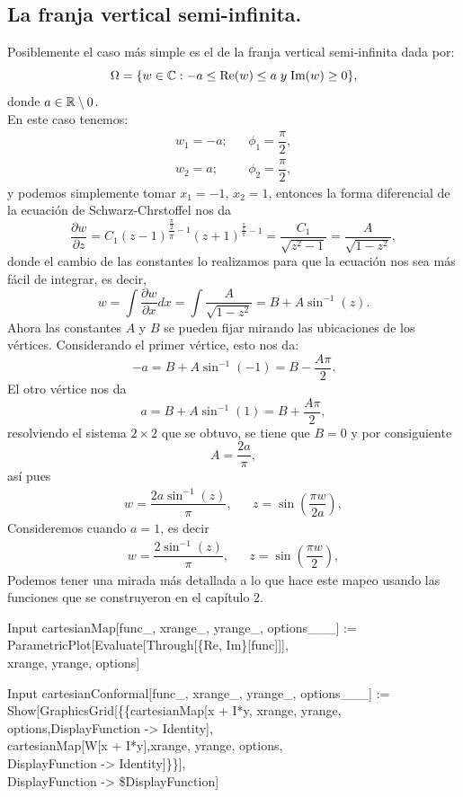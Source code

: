 \subsection{La franja vertical semi-infinita.}
Posiblemente el caso más simple es el de la franja vertical semi-infinita dada por:
$$\Omega=\{ w\in \mathbb{C} : -a\leq \mbox{Re}(w)\leq a\; y \; \mbox{Im}(w)\geq 0  \},$$
donde $a\in\mathbb{R}\setminus{0}$.\\
En este caso tenemos:
\[
\begin{array}{lcr}
	w_1=-a;&&\phi_1=\dfrac{\pi}{2},\\
	w_2=a;&&\phi_2=\dfrac{\pi}{2},
\end{array}
\]
y podemos simplemente tomar $x_1=-1$, $x_2=1$, entonces la forma diferencial de la ecuación de Schwarz-Chrstoffel nos da
$$\dfrac{\partial w}{\partial z}=C_1(z-1)^{\dfrac{\frac{\pi}{2}}{\pi}-1}(z+1)^{\frac{\frac{\pi}{2}}{\pi}-1}=\dfrac{C_1}{\sqrt{z^2-1}}=\dfrac{A}{\sqrt{1-z^2}},$$
donde el cambio de las constantes lo realizamos para que la ecuación nos sea más fácil de integrar, es decir,
\[
w=\int \dfrac{\partial w}{\partial x}dx=\int \dfrac{A}{\sqrt{1-z^2}}=B+A\sin^{-1}(z).
\]
Ahora las constantes $A$ y $B$ se pueden fijar mirando las ubicaciones de los vértices. Considerando el primer vértice, esto nos da:
$$-a=B+A\sin^{-1}(-1)=B-\dfrac{A\pi}{2}.$$
El otro vértice nos da
$$a=B+A\sin^{-1}(1)=B+\dfrac{A\pi}{2},$$
resolviendo el sistema $2\times2$ que se obtuvo, se tiene que $B=0$ y por consiguiente $$A=\dfrac{2a}{\pi},$$
así pues 
\[
\begin{array}{lcr}
	w=\dfrac{2a\sin^{-1}(z)}{\pi},&&z=\sin\left(\dfrac{\pi w}{2a}\right),
\end{array}
\]
Consideremos cuando $a=1$, es decir
\[
\begin{array}{lcr}
	w=\dfrac{2\sin^{-1}(z)}{\pi},&&z=\sin\left(\dfrac{\pi w}{2}\right),
\end{array}
\]
Podemos tener una mirada más detallada a lo que hace este mapeo usando las funciones que se construyeron en el capítulo 2.

\begin{mmaCell}{Input}
	 cartesianMap[func_, xrange_, yrange_, options___] := \\ParametricPlot[Evaluate[Through[\{Re, Im\}[func]]],\\xrange, yrange, options]
\end{mmaCell}

\newpage
\begin{mmaCell}{Input}
	 cartesianConformal[func_, xrange_, yrange_, options___] :=\\Show[GraphicsGrid[\{\{cartesianMap[x + I*y, xrange, yrange,\\options,DisplayFunction -> Identity],\\cartesianMap[W[x + I*y],xrange, yrange, options,\\DisplayFunction -> Identity]\}\}],\\DisplayFunction -> \$DisplayFunction]
\end{mmaCell}


